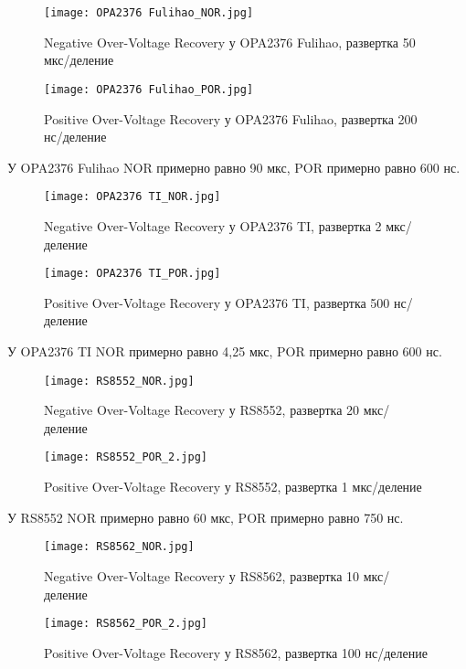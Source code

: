\begin{figure}[H]
\centering
\texttt{[image: OPA2376 Fulihao\_NOR.jpg]}
\caption{Negative Over-Voltage Recovery у OPA2376 Fulihao, развертка 50 мкс/деление}
\label{ris:417}
\end{figure}

\begin{figure}[H]
\centering
\texttt{[image: OPA2376 Fulihao\_POR.jpg]}
\caption{Positive Over-Voltage Recovery у OPA2376 Fulihao, развертка 200 нс/деление}
\label{ris:418}
\end{figure}

У OPA2376 Fulihao NOR примерно равно 90 мкс,
POR примерно равно 600 нс.

\begin{figure}[H]
\centering
\texttt{[image: OPA2376 TI\_NOR.jpg]}
\caption{Negative Over-Voltage Recovery у OPA2376 TI, развертка 2 мкс/деление}
\label{ris:419}
\end{figure}

\begin{figure}[H]
\centering
\texttt{[image: OPA2376 TI\_POR.jpg]}
\caption{Positive Over-Voltage Recovery у OPA2376 TI, развертка 500 нс/деление}
\label{ris:420}
\end{figure}

У OPA2376 TI NOR примерно равно 4,25 мкс, 
POR примерно равно 600 нс. 

\begin{figure}[H]
\centering
\texttt{[image: RS8552\_NOR.jpg]}
\caption{Negative Over-Voltage Recovery у RS8552, развертка 20 мкс/деление}
\label{ris:421}
\end{figure}

\begin{figure}[H]
\centering
\texttt{[image: RS8552\_POR\_2.jpg]}
\caption{Positive Over-Voltage Recovery у RS8552, развертка 1 мкс/деление}
\label{ris:422}
\end{figure}

У RS8552 NOR примерно равно 60 мкс, 
POR примерно равно 750 нс.

\begin{figure}[H]
\centering
\texttt{[image: RS8562\_NOR.jpg]}
\caption{Negative Over-Voltage Recovery у RS8562, развертка 10 мкс/деление}
\label{ris:423}
\end{figure}

\begin{figure}[H]
\centering
\texttt{[image: RS8562\_POR\_2.jpg]}
\caption{Positive Over-Voltage Recovery у RS8562, развертка 100 нс/деление}
\label{ris:424}
\end{figure}


